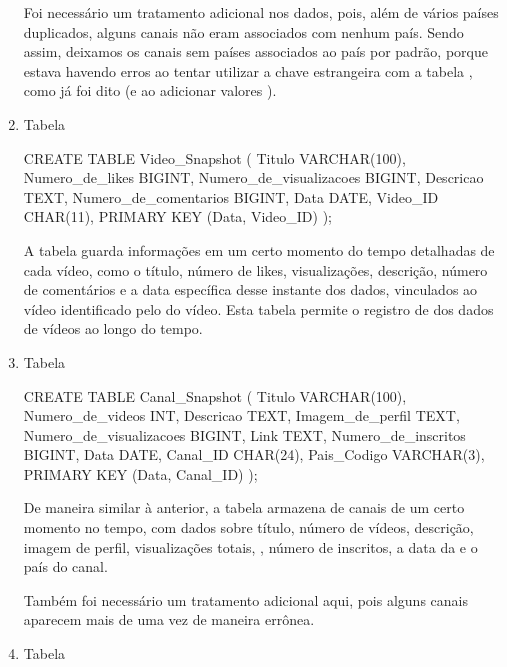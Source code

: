 \begin{enumerate}
  Foi necessário um tratamento adicional nos dados, pois, além de vários países duplicados, alguns canais não eram associados com nenhum país. Sendo assim, deixamos os canais sem países associados ao país  por padrão, porque estava havendo erros ao tentar utilizar a chave estrangeira com a tabela , como já foi dito (e ao adicionar valores ).

  \item Tabela 

  \begin{code}
    CREATE TABLE Video_Snapshot (
      Titulo VARCHAR(100),
      Numero_de_likes BIGINT,
      Numero_de_visualizacoes BIGINT,
      Descricao TEXT,
      Numero_de_comentarios BIGINT,
      Data DATE,
      Video_ID CHAR(11),
      PRIMARY KEY (Data, Video_ID)
    );
  \end{code}

  A tabela  guarda informações em um certo momento do tempo detalhadas de cada vídeo, como o título, número de likes, visualizações, descrição, número de comentários e a data específica desse instante dos dados, vinculados ao vídeo identificado pelo  do vídeo. Esta tabela permite o registro de  dos dados de vídeos ao longo do tempo.

  \item Tabela 

  \begin{code}
    CREATE TABLE Canal_Snapshot (
      Titulo VARCHAR(100),
      Numero_de_videos INT,
      Descricao TEXT,
      Imagem_de_perfil TEXT,
      Numero_de_visualizacoes BIGINT,
      Link TEXT,
      Numero_de_inscritos BIGINT,
      Data DATE,
      Canal_ID CHAR(24),
      Pais_Codigo VARCHAR(3),
      PRIMARY KEY (Data, Canal_ID)
    );
  \end{code}

  De maneira similar à anterior, a tabela  armazena  de canais de um certo momento no tempo, com dados sobre título, número de vídeos, descrição, imagem de perfil, visualizações totais, , número de inscritos, a data da  e o país do canal.

  Também foi necessário um tratamento adicional aqui, pois alguns canais aparecem mais de uma vez de maneira errônea.

  \item Tabela 


\end{enumerate}

